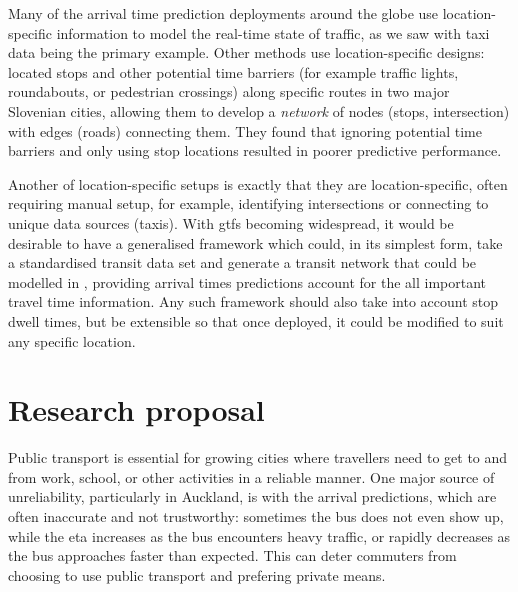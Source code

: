 Many of the arrival time prediction deployments around the globe use location-specific information to model the real-time state of traffic, as we saw with taxi data being the primary example. Other methods use location-specific designs: \citet{Celan_2017,Celan_2018} located stops and other potential time barriers (for example traffic lights, roundabouts, or pedestrian crossings) along specific routes in two major Slovenian cities, allowing them to develop a \emph{network} of nodes (stops, intersection) with edges (roads) connecting them. They found that ignoring potential time barriers and only using stop locations resulted in poorer predictive performance. 


Another  of location-specific setups is exactly that they are location-specific, often requiring manual setup, for example, identifying intersections or connecting to unique data sources (taxis). With \gls{gtfs} becoming widespread, it would be desirable to have a generalised framework which could, in its simplest form, take a standardised transit data set and generate a transit network that could be modelled in \rt{}, providing arrival times predictions account for the all important travel time information. Any such framework should also take into account stop dwell times, but be extensible so that once deployed, it could be modified to suit any specific location. 




\section{Research proposal}
\label{eq:proposal}

Public transport is essential for growing cities where travellers need to get to and from work, school, or other activities in a reliable manner. One major source of unreliability, particularly in Auckland, is with the \rt{} arrival predictions, which are often inaccurate and not trustworthy: sometimes the bus does not even show up, while  the \gls{eta} increases as the bus encounters heavy traffic, or rapidly decreases as the bus approaches faster than expected. This can deter commuters from choosing to use public transport and prefering private means.


